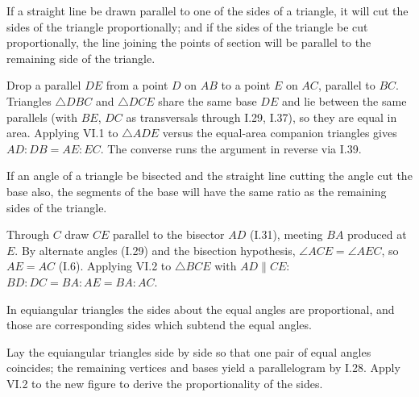\documentclass{rrxiv}
\begin{document}
\begin{claim}
\label{prop:VI.2}
If a straight line be drawn parallel to one of the sides of a
triangle, it will cut the sides of the triangle proportionally; and
if the sides of the triangle be cut proportionally, the line joining
the points of section will be parallel to the remaining side of the
triangle.
\end{claim}
\begin{evidence}[Proof of VI.2]
\label{ev:VI.2}
Drop a parallel $DE$ from a point $D$ on $AB$ to a point $E$ on $AC$,
parallel to $BC$.  Triangles $\triangle DBC$ and $\triangle DCE$
share the same base $DE$ and lie between the same parallels (with
$BE$, $DC$ as transversals through I.29, I.37), so they are equal in
area.  Applying VI.1 to $\triangle ADE$ versus the equal-area
companion triangles gives $AD : DB = AE : EC$.  The converse runs the
argument in reverse via I.39.
\end{evidence}

\begin{claim}
\label{prop:VI.3}
If an angle of a triangle be bisected and the straight line cutting
the angle cut the base also, the segments of the base will have the
same ratio as the remaining sides of the triangle.
\end{claim}
\begin{evidence}[Proof of VI.3]
\label{ev:VI.3}
Through $C$ draw $CE$ parallel to the bisector $AD$ (I.31), meeting
$BA$ produced at $E$.  By alternate angles (I.29) and the bisection
hypothesis, $\angle ACE = \angle AEC$, so $AE = AC$ (I.6).  Applying
VI.2 to $\triangle BCE$ with $AD \parallel CE$: $BD : DC = BA : AE =
BA : AC$.
\end{evidence}

\begin{claim}
\label{prop:VI.4}
In equiangular triangles the sides about the equal angles are
proportional, and those are corresponding sides which subtend the
equal angles.
\end{claim}
\begin{evidence}[Proof of VI.4]
\label{ev:VI.4}
Lay the equiangular triangles side by side so that one pair of equal
angles coincides; the remaining vertices and bases yield a
parallelogram by I.28.  Apply VI.2 to the new figure to derive the
proportionality of the sides.
\end{evidence}
\end{document}
